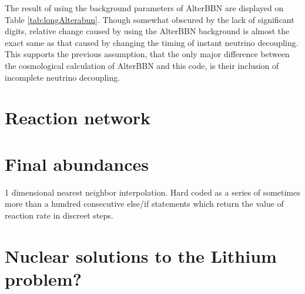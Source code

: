 The result of using the background parameters of AlterBBN are displayed on Table \ref{tab:longAlterabun}. Though somewhat obscured by the lack of significant digits, relative change caused by using the AlterBBN background is almost the exact same as that caused by changing the timing of instant neutrino decoupling. This supports the previous assumption, that the only major difference between the cosmological calculation of AlterBBN and this code, is their inclusion of incomplete neutrino decoupling.


\section{Reaction network}




\section{Final abundances}


1 dimensional nearest neighbor interpolation. 
Hard coded as a series of sometimes more than a hundred consecutive else/if statements which return the value of reaction rate in discreet steps.
\section{Nuclear solutions to the Lithium problem?}